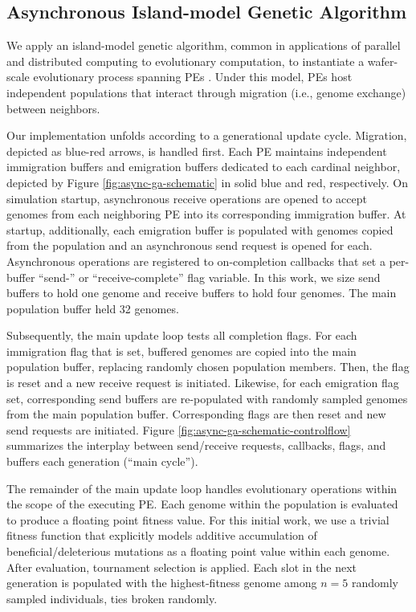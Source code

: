 \subsection{Asynchronous Island-model Genetic Algorithm}




We apply an island-model genetic algorithm, common in applications of parallel and distributed computing to evolutionary computation, to instantiate a wafer-scale evolutionary process spanning PEs \citep{bennett1999building}.
Under this model, PEs host independent populations that interact through migration (i.e., genome exchange) between neighbors.

Our implementation unfolds according to a generational update cycle.
Migration, depicted as blue-red arrows, is handled first.
Each PE maintains independent immigration buffers and emigration buffers dedicated to each cardinal neighbor, depicted by Figure \ref{fig:async-ga-schematic} in solid blue and red, respectively.
On simulation startup, asynchronous receive operations are opened to accept genomes from each neighboring PE into its corresponding immigration buffer.
At startup, additionally, each emigration buffer is populated with genomes copied from the population and an asynchronous send request is opened for each. %
Asynchronous operations are registered to on-completion callbacks that set a per-buffer ``send-'' or ``receive-complete'' flag variable.
In this work, we size send buffers to hold one genome and receive buffers to hold four genomes.
The main population buffer held 32 genomes.

Subsequently, the main update loop tests all completion flags.
For each immigration flag that is set, buffered genomes are copied into the main population buffer, replacing randomly chosen population members.
Then, the flag is reset and a new receive request is initiated.
Likewise, for each emigration flag set, corresponding send buffers are re-populated with randomly sampled genomes from the main population buffer.
Corresponding flags are then reset and new send requests are initiated.
Figure \ref{fig:async-ga-schematic-controlflow} summarizes the interplay between send/receive requests, callbacks, flags, and buffers each generation (``main cycle'').

The remainder of the main update loop handles evolutionary operations within the scope of the executing PE.
Each genome within the population is evaluated to produce a floating point fitness value.
For this initial work, we use a trivial fitness function that explicitly models additive accumulation of beneficial/deleterious mutations as a floating point value within each genome.
After evaluation, tournament selection is applied.
Each slot in the next generation is populated with the highest-fitness genome among $n=5$ randomly sampled individuals, ties broken randomly.

